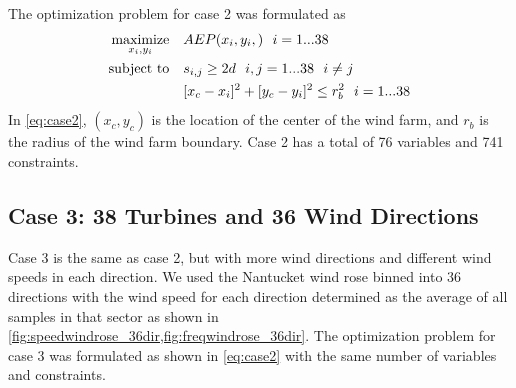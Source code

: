 \documentclass{jpconf}
\begin{document}
The optimization problem for case 2 was formulated as
%
\begin{equation}\label{eq:case2}
	\begin{aligned} [b]
	\underset{x_i,y_i}{\textrm{maximize}} \quad & AEP(x_i,y_i,)~~i=1...38\\
	\textrm{subject to} \quad & s_{i,j} \geq 2\*d~~i,j=1...38~~i \neq j\\
	 & [x_c-x_i]^2+[y_c-y_i]^2 \leq r_{b}^2~~i=1...38
	\end{aligned}
\end{equation}
%
In \cref{eq:case2}, $(x_c,y_c)$ is the location of the center of the wind farm, and $r_b$ is the radius of the wind farm boundary. Case 2 has a total of 76 variables and 741 constraints.

\subsection{Case 3: 38 Turbines and 36 Wind Directions}
%
Case 3 is the same as case 2, but with more wind directions and different wind speeds in each direction. We used the Nantucket wind rose binned into 36 directions with the wind speed for each direction determined as the average of all samples in that sector as shown in \cref{fig:speedwindrose_36dir,fig:freqwindrose_36dir}. The optimization problem for case 3 was formulated as shown in \cref{eq:case2} with the same number of variables and constraints.
%
\end{document}
